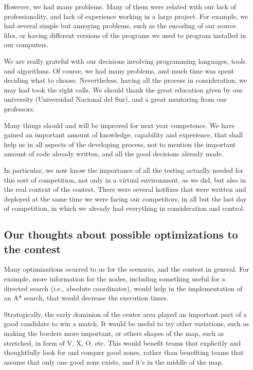\documentclass{llncs2e/llncs}
\begin{document}
    However, we had many problems. Many of them were related with our lack of 
    professionality, and lack of experience working in a large project. 
    For example, we had several simple but annoying problems, such as the 
    encoding of our source files, or having different versions of the programs 
    we used to program installed in our computers.

    We are really grateful with our decisions involving programming languages, 
    tools and algorithms. Of course, we had many problems, and much time was spent 
    deciding what to choose. Nevertheless, having all the process in 
    consideration, we may had took the right calls. We should thank the great 
    education given by our university (Universidad Nacional del Sur), and a 
    great mentoring from our professors.

    Many things should and will be improved for next year competence. We have
    gained an important amount of knowledge, capability and experience, that shall 
    help us in all aspects of the developing process, not to mention the 
    important amount of code already written, and all the good decisions already 
    made.

    In particular, we now know the importance of all the testing actually needed 
    for this sort of competition, not only in a virtual environment, as we did, 
    but also in the real context of the contest. There were several hotfixes that 
    were written and deployed at the same time we were facing our competitors, in 
    all but the last day of competition, in which we already had everything in 
    consideration and control.

\subsection{Our thoughts about possible optimizations to the contest}
    
    Many optimizations ocurred to us for the scenario, and the contest in general. 
    For example, more information for the nodes, including something useful for a 
    directed search (i.e., absolute coordinates), would help in the implementation 
    of an A* search, that would decrease the execution times.

    Strategically, the early dominion of the center area played an important part 
    of a good candidate to win a match. It would be useful to try other 
    variations, such as making the borders more important, or others shapes of the 
    map, such as stretched, in form of V, X, O, etc. This would benefit teams that 
    explicitly and thoughtfully look for and conquer good zones, rather than 
    benefiting teams that assume that only one good zone exists, and it's in the 
    middle of the map.
\end{document}
